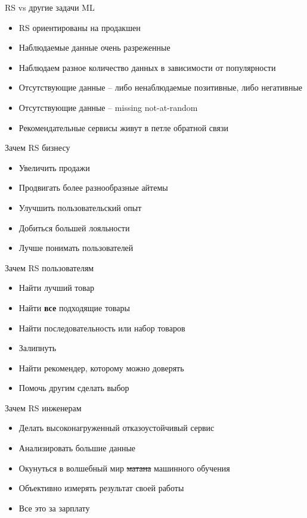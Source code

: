 \documentclass[11pt,aspectratio=169,handout]{beamer}
\begin{document}
\begin{frame}{RS vs другие задачи ML \cite{NETFLIX}}

\begin{itemize}[<+->]
\item RS ориентированы на продакшен
\item Наблюдаемые данные очень разреженные
\item Наблюдаем разное количество данных в зависимости от популярности
\item Отсутствующие данные -- либо ненаблюдаемые позитивные, либо негативные
\item Отсутствующие данные -- missing not-at-random
\item Рекомендательные сервисы живут в петле обратной связи
\end{itemize}

\end{frame}

\begin{frame}{Зачем RS бизнесу}

\begin{itemize}[<+->]
\item Увеличить продажи
\item Продвигать более разнообразные айтемы
\item Улучшить пользовательский опыт
\item Добиться большей лояльности
\item Лучше понимать пользователей
\end{itemize}

\end{frame}

\begin{frame}{Зачем RS пользователям}

\begin{itemize}[<+->]
\item Найти лучший товар
\item Найти {\bf все} подходящие товары
\item Найти последовательность или набор товаров
\item Залипнуть
\item Найти рекомендер, которому можно доверять
\item Помочь другим сделать выбор
\end{itemize}

\end{frame}

\begin{frame}{Зачем RS инженерам}

\begin{itemize}
\item Делать высоконагруженный отказоустойчивый сервис
\item Анализировать большие данные
\item Окунуться в волшебный мир \sout{матана} машинного обучения
\item Объективно измерять результат своей работы 
\item Все это за зарплату
\end{itemize}

\end{frame}
\end{document}
